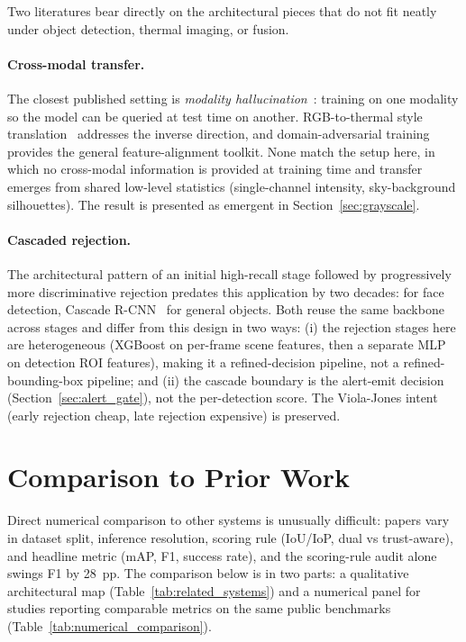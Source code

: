 Two literatures bear directly on the architectural pieces that do not fit neatly under object detection, thermal imaging, or fusion.

\paragraph{Cross-modal transfer.}
The closest published setting is \emph{modality hallucination}~\cite{hoffman2016modalityhallucination}: training on one modality so the model can be queried at test time on another. RGB-to-thermal style translation~\cite{berg2018rgb2thermal,kniaz2018thermalgan} addresses the inverse direction, and domain-adversarial training~\cite{ganin2016domain} provides the general feature-alignment toolkit. None match the setup here, in which no cross-modal information is provided at training time and transfer emerges from shared low-level statistics (single-channel intensity, sky-background silhouettes). The result is presented as emergent in Section~\ref{sec:grayscale}.

\paragraph{Cascaded rejection.}
The architectural pattern of an initial high-recall stage followed by progressively more discriminative rejection predates this application by two decades: \citet{viola2001rapid} for face detection, Cascade R-CNN~\cite{cai2018cascade} for general objects. Both reuse the same backbone across stages and differ from this design in two ways: (i) the rejection stages here are heterogeneous (XGBoost on per-frame scene features, then a separate MLP on detection ROI features), making it a refined-decision pipeline, not a refined-bounding-box pipeline; and (ii) the cascade boundary is the alert-emit decision (Section~\ref{sec:alert_gate}), not the per-detection score. The Viola-Jones intent (early rejection cheap, late rejection expensive) is preserved.

\section{Comparison to Prior Work}
\label{sec:comparison}

Direct numerical comparison to other systems is unusually difficult: papers vary in dataset split, inference resolution, scoring rule (IoU/IoP, dual vs trust-aware), and headline metric (mAP, F1, success rate), and the scoring-rule audit alone swings F1 by 28~pp. The comparison below is in two parts: a qualitative architectural map (Table~\ref{tab:related_systems}) and a numerical panel for studies reporting comparable metrics on the same public benchmarks (Table~\ref{tab:numerical_comparison}).

